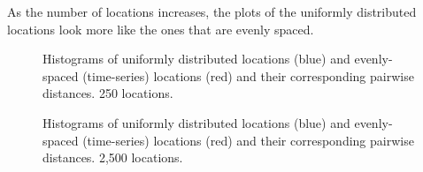 \documentclass[
]{article}
\begin{document}
As the number of locations increases, the plots of the uniformly
distributed locations look more like the ones that are evenly spaced.

\begin{figure}

\begin{minipage}[t]{\linewidth}

{\centering 


}

\end{minipage}%
\newline
\begin{minipage}[t]{\linewidth}

{\centering 


}

\end{minipage}%

\caption{\label{fig-hist-loc}Histograms of uniformly distributed
locations (blue) and evenly-spaced (time-series) locations (red) and
their corresponding pairwise distances. 250 locations.}

\end{figure}

\begin{figure}

\begin{minipage}[t]{\linewidth}

{\centering 


}

\end{minipage}%
\newline
\begin{minipage}[t]{\linewidth}

{\centering 


}

\end{minipage}%

\caption{\label{fig-hist-loc-x10}Histograms of uniformly distributed
locations (blue) and evenly-spaced (time-series) locations (red) and
their corresponding pairwise distances. 2,500 locations.}

\end{figure}
\end{document}
